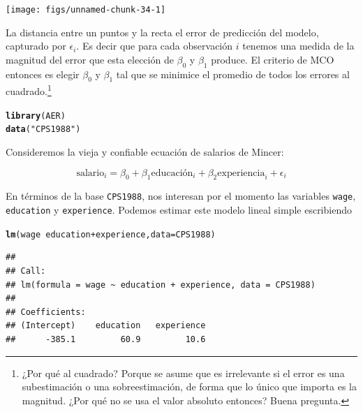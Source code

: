 \documentclass{article}\usepackage[]{graphicx}\usepackage[]{color}
\makeatletter
\newcommand{\hlstr}[1]{\textcolor[rgb]{0.192,0.494,0.8}{#1}}%
\newcommand{\hlopt}[1]{\textcolor[rgb]{0,0,0}{#1}}%
\newcommand{\hlstd}[1]{\textcolor[rgb]{0.345,0.345,0.345}{#1}}%
\newcommand{\hlkwc}[1]{\textcolor[rgb]{0.333,0.667,0.333}{#1}}%
\newcommand{\hlkwd}[1]{\textcolor[rgb]{0.737,0.353,0.396}{\textbf{#1}}}%
\newenvironment{kframe}{%
 \def\at@end@of@kframe{}%
 \ifinner\ifhmode%
  \def\at@end@of@kframe{\end{minipage}}%
  \begin{minipage}{\columnwidth}%
 \fi\fi%
 \def\FrameCommand##1{\hskip\@totalleftmargin \hskip-\fboxsep
 \colorbox{shadecolor}{##1}\hskip-\fboxsep
     \hskip-\linewidth \hskip-\@totalleftmargin \hskip\columnwidth}%
 \MakeFramed {\advance\hsize-\width
   \@totalleftmargin\z@ \linewidth\hsize
   \@setminipage}}%
 {\par\unskip\endMakeFramed%
 \at@end@of@kframe}
\newenvironment{knitrout}{}{} %
\newcommand*{\paq}[1]{\textbf{#1}}
\makeatother
\begin{document}
\begin{knitrout}
\color{fgcolor}

{\centering \texttt{[image: figs/unnamed-chunk-34-1]} 

}



\end{knitrout}

La distancia entre un puntos y la recta el error de predicción del modelo, capturado por $\epsilon_i$. Es decir que para cada observación $i$ tenemos una medida de la magnitud del error que esta elección de $\beta_0$ y $\beta_1$ produce. El criterio de MCO entonces es elegir $\beta_0$ y $\beta_1$ tal que se minimice el promedio de todos los errores al cuadrado.\footnote{¿Por qué al cuadrado? Porque se asume que es irrelevante si el error es una subestimación o una sobreestimación, de forma que lo único que importa es la magnitud. ¿Por qué no se usa el valor absoluto entonces? Buena pregunta.}



\hrulefill

\begin{knitrout}
\color{fgcolor}\begin{kframe}
\begin{alltt}
\hlkwd{library}\hlstd{(AER)}
\hlkwd{data}\hlstd{(}\hlstr{"CPS1988"}\hlstd{)}
\end{alltt}
\end{kframe}
\end{knitrout}

Consideremos la vieja y confiable ecuación de salarios de Mincer:

\begin{equation}
\text{salario}_i = \beta_0 + \beta_1 \text{educación}_i + \beta_2 \text{experiencia}_i + \epsilon_i
\label{eq:mincer}
\end{equation}

En términos de la base \verb|CPS1988|, nos interesan por el momento las variables \verb|wage|, \verb|education| y \verb|experience|. Podemos estimar este modelo lineal simple escribiendo

\begin{knitrout}
\color{fgcolor}\begin{kframe}
\begin{alltt}
\hlkwd{lm}\hlstd{(wage} \hlopt{~} \hlstd{education} \hlopt{+} \hlstd{experience,} \hlkwc{data} \hlstd{= CPS1988)}
\end{alltt}
\begin{verbatim}
## 
## Call:
## lm(formula = wage ~ education + experience, data = CPS1988)
## 
## Coefficients:
## (Intercept)    education   experience  
##      -385.1         60.9         10.6
\end{verbatim}
\end{kframe}
\end{knitrout}
\end{document}
